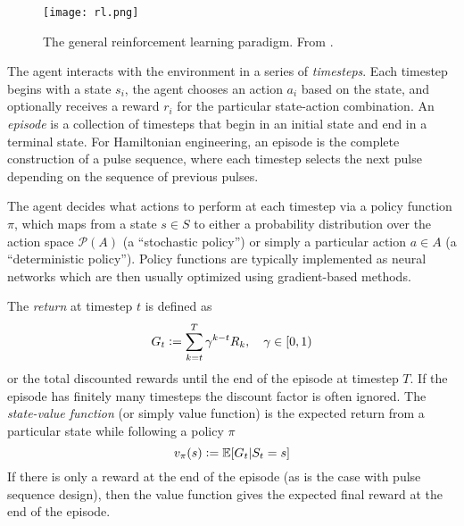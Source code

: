 \begin{figure}[H]
    \centering
    \texttt{[image: rl.png]}
    \caption{The general reinforcement learning paradigm. From \cite{sutton2018reinforcement}.}
    \label{fig:RL}
\end{figure}

The agent interacts with the environment in a series of \emph{timesteps}. Each timestep begins with a state $s_i$, the agent chooses an action $a_i$ based on the state, and optionally receives a reward $r_i$ for the particular state-action combination. An \emph{episode} is a collection of timesteps that begin in an initial state and end in a terminal state. For Hamiltonian engineering, an episode is the complete construction of a pulse sequence, where each timestep selects the next pulse depending on the sequence of previous pulses.

The agent decides what actions to perform at each timestep via a policy function $\pi$, which maps from a state $s \in S$ to either a probability distribution over the action space $\mathcal{P}(A)$ (a ``stochastic policy'') or simply a particular action $a \in A$ (a ``deterministic policy''). Policy functions are typically implemented as neural networks which are then usually optimized using gradient-based methods.

The \emph{return} at timestep $t$ is defined as
\begin{equation}\label{eq:return}
    G_t \mathrel{\mathop:}= \sum_{k=t}^T \gamma^{k-t} R_k, \quad \gamma \in [0,1)
\end{equation}
or the total discounted rewards until the end of the episode at timestep $T$. If the episode has finitely many timesteps the discount factor is often ignored. The \emph{state-value function} (or simply value function) is the expected return from a particular state while following a policy $\pi$
\begin{equation}\label{eq:state_value}
    v_\pi(s) \mathrel{\mathop:}= \mathbb E[G_t | S_t = s]
\end{equation}
If there is only a reward at the end of the episode (as is the case with pulse sequence design), then the value function gives the expected final reward at the end of the episode.







